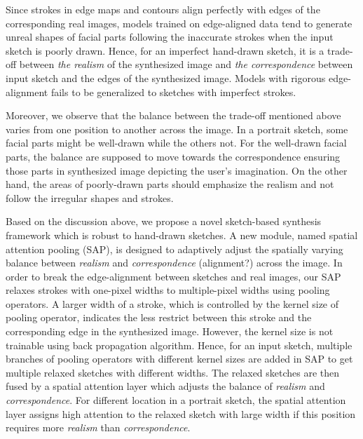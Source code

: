Since strokes in edge maps and contours align perfectly with edges of the corresponding real images, models trained on edge-aligned data tend to generate unreal shapes of facial parts following the inaccurate strokes when the input sketch is poorly drawn. Hence, for an imperfect hand-drawn sketch, it is a trade-off between \textit{the realism} of the synthesized image and \textit{the correspondence} between input sketch and the edges of the synthesized image.
Models with rigorous edge-alignment fails to be generalized to sketches with imperfect strokes.

Moreover, we observe that the balance between the trade-off mentioned above varies from one position to another across the image. In a portrait sketch, some facial parts might be well-drawn while the others not. For the well-drawn facial parts, the balance are supposed to move towards the correspondence ensuring those parts in synthesized image depicting the user's imagination. On the other hand, the areas of poorly-drawn parts should emphasize the realism and not follow the irregular shapes and strokes.

Based on the discussion above, we propose a novel sketch-based synthesis framework which is robust to hand-drawn sketches. A new module, named spatial attention pooling (SAP), is designed to adaptively adjust the spatially varying balance between \textit{realism} and \textit{correspondence} \cxj(alignment?) across the image. In order to break the edge-alignment between sketches and real images, our SAP relaxes strokes with one-pixel widths to multiple-pixel widths using pooling operators. A larger width of a stroke, which is controlled by the kernel size of pooling operator, indicates the less restrict between this stroke and the corresponding edge in the synthesized image. However, the kernel size is not trainable using back propagation algorithm. Hence, for an input sketch, multiple branches of pooling operators with different kernel sizes are added in SAP to get multiple relaxed sketches with different widths. The relaxed sketches are then fused by a spatial attention layer which adjusts the balance of \textit{realism} and \textit{correspondence}. For different location in a portrait sketch, the spatial attention layer assigns high attention to the relaxed sketch with large width if this position requires more \textit{realism} than \textit{correspondence}. 

